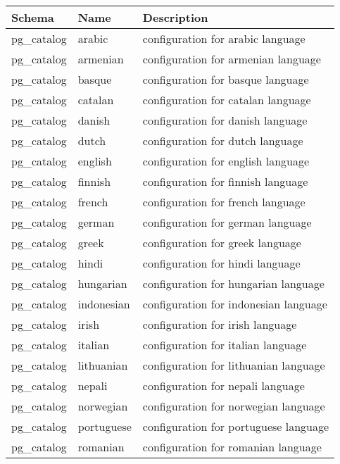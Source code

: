 \begin{longtable}{|l|l|l|}
    \hline
    \textbf{Schema}    & \textbf{Name}    & \textbf{Description}     \\ \hline
    pg\_catalog & arabic     & configuration for arabic language     \\ \hline
    pg\_catalog & armenian   & configuration for armenian language   \\ \hline
    pg\_catalog & basque     & configuration for basque language     \\ \hline
    pg\_catalog & catalan    & configuration for catalan language    \\ \hline
    pg\_catalog & danish     & configuration for danish language     \\ \hline
    pg\_catalog & dutch      & configuration for dutch language      \\ \hline
    pg\_catalog & english    & configuration for english language    \\ \hline
    pg\_catalog & finnish    & configuration for finnish language    \\ \hline
    pg\_catalog & french     & configuration for french language     \\ \hline
    pg\_catalog & german     & configuration for german language     \\ \hline
    pg\_catalog & greek      & configuration for greek language      \\ \hline
    pg\_catalog & hindi      & configuration for hindi language      \\ \hline
    pg\_catalog & hungarian  & configuration for hungarian language  \\ \hline
    pg\_catalog & indonesian & configuration for indonesian language \\ \hline
    pg\_catalog & irish      & configuration for irish language      \\ \hline
    pg\_catalog & italian    & configuration for italian language    \\ \hline
    pg\_catalog & lithuanian & configuration for lithuanian language \\ \hline
    pg\_catalog & nepali     & configuration for nepali language     \\ \hline
    pg\_catalog & norwegian  & configuration for norwegian language  \\ \hline
    pg\_catalog & portuguese & configuration for portuguese language \\ \hline
    pg\_catalog & romanian   & configuration for romanian language   \\ \hline

\end{longtable}
